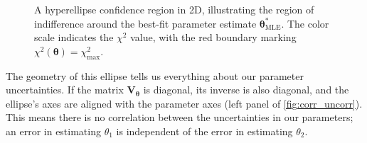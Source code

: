 \begin{figure}[h!]
    \centering
    \caption{A hyperellipse confidence region in 2D, illustrating the region of indifference around the best-fit parameter estimate $\boldsymbol{\theta}^*_{\text{MLE}}$. The color scale indicates the $\chi^2$ value, with the red boundary marking $\chi^2(\boldsymbol{\theta}) = \chi^2_{\text{max}}$.}
    \label{fig:hyperellipse}
\end{figure}

The geometry of this ellipse tells us everything about our parameter uncertainties. If the matrix $\mathbf{V}_{\boldsymbol{\theta}}$ is diagonal, its inverse is also diagonal, and the ellipse's axes are aligned with the parameter axes (left panel of \autoref{fig:corr_uncorr}). This means there is no correlation between the uncertainties in our parameters; an error in estimating $\theta_1$ is independent of the error in estimating $\theta_2$. 

